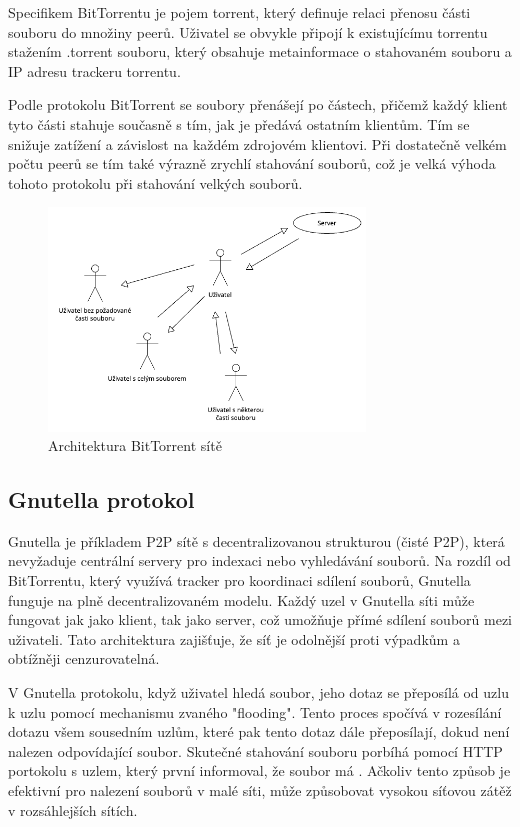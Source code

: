 \documentclass[10pt,twoside,czech,a4paper]{article}
\begin{document}
Specifikem BitTorrentu je pojem torrent, který definuje relaci přenosu části souboru do množiny peerů.
Uživatel se obvykle připojí k existujícímu torrentu stažením .torrent souboru, který obsahuje metainformace o stahovaném souboru a IP adresu trackeru torrentu\cite{Legout2005, Chokkalingam2004}.

Podle protokolu BitTorrent se soubory přenášejí po částech, přičemž každý klient tyto části stahuje současně s tím, jak je předává ostatním klientům.
Tím se snižuje zatížení a závislost na každém zdrojovém klientovi\cite{Lande2008}.
Při dostatečně velkém počtu peerů se tím také výrazně zrychlí stahování souborů, což je velká výhoda tohoto protokolu při stahování velkých souborů\cite{Barakat2004}.

\begin{figure}[H]
	\centering
	\includegraphics[width=0.75\textwidth]{BitTorrent.png}
	\caption{Architektura BitTorrent sítě}
\end{figure}

\subsection{Gnutella protokol}

Gnutella je příkladem P2P sítě s decentralizovanou strukturou (čisté P2P), která nevyžaduje centrální servery pro indexaci nebo vyhledávání souborů.
Na rozdíl od BitTorrentu, který využívá tracker pro koordinaci sdílení souborů, Gnutella funguje na plně decentralizovaném modelu.
Každý uzel v Gnutella síti může fungovat jak jako klient, tak jako server, což umožňuje přímé sdílení souborů mezi uživateli.
Tato architektura zajišťuje, že síť je odolnější proti výpadkům a obtížněji cenzurovatelná.

V Gnutella protokolu, když uživatel hledá soubor, jeho dotaz se přeposílá od uzlu k uzlu pomocí mechanismu zvaného "flooding".
Tento proces spočívá v rozesílání dotazu všem sousedním uzlům, které pak tento dotaz dále přeposílají, dokud není nalezen odpovídající soubor\cite{Howe2000}.
Skutečné stahování souboru porbíhá pomocí HTTP portokolu s uzlem, který první informoval, že soubor má \cite{Gnutella, Portmann2001}.
Ačkoliv tento způsob je efektivní pro nalezení souborů v malé síti, může způsobovat vysokou síťovou zátěž v rozsáhlejších sítích\cite{Ripeanu2001}.
\end{document}
